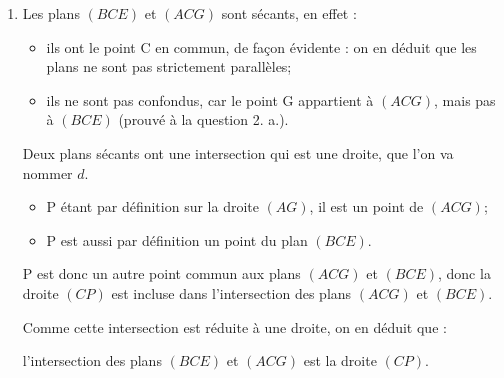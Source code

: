 \begin{enumerate}
\item Les plans $(BCE)$ et $(ACG)$ sont sécants, en effet :
\begin{itemize}
\item ils ont le point C en commun, de façon évidente : on en déduit que les plans ne sont pas strictement parallèles;
\item ils ne sont pas confondus, car le point G appartient à $(ACG)$, mais pas à $(BCE)$ (prouvé à la question 2. a.).
\end{itemize}
Deux plans sécants ont une intersection qui est une droite, que l'on va nommer $d$.
\begin{itemize}
\item P étant par définition sur la droite $(AG)$, il est un point de $(ACG)$;
\item P est aussi par définition un point du plan $(BCE)$.
\end{itemize}
P est donc un autre point commun aux plans $(ACG)$ et $(BCE)$, donc la droite $(CP)$ est incluse dans l'intersection des plans $(ACG)$ et $(BCE)$.

Comme cette intersection est réduite à une droite, on en déduit que :

l'intersection des plans $(BCE)$ et $(ACG)$ est la droite $(CP)$.
\end{enumerate}

